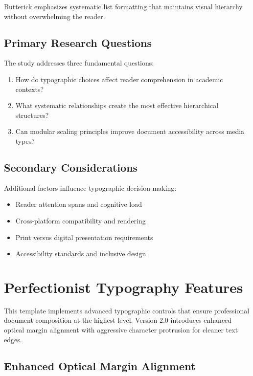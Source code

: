 \documentclass[11pt]{article}
\begin{document}
Butterick emphasizes systematic list formatting that maintains visual hierarchy without overwhelming the reader.

\subsection{Primary Research Questions}

The study addresses three fundamental questions:

\begin{enumerate}
\item How do typographic choices affect reader comprehension in academic contexts?
\item What systematic relationships create the most effective hierarchical structures?
\item Can modular scaling principles improve document accessibility across media types?
\end{enumerate}

\subsection{Secondary Considerations}

Additional factors influence typographic decision-making:

\begin{itemize}
\item Reader attention spans and cognitive load
\item Cross-platform compatibility and rendering
\item Print versus digital presentation requirements
\item Accessibility standards and inclusive design
\end{itemize}

\section{Perfectionist Typography Features}

This template implements advanced typographic controls that ensure professional document composition at the highest level. Version 2.0 introduces enhanced optical margin alignment with aggressive character protrusion for cleaner text edges.

\subsection{Enhanced Optical Margin Alignment}
\end{document}
